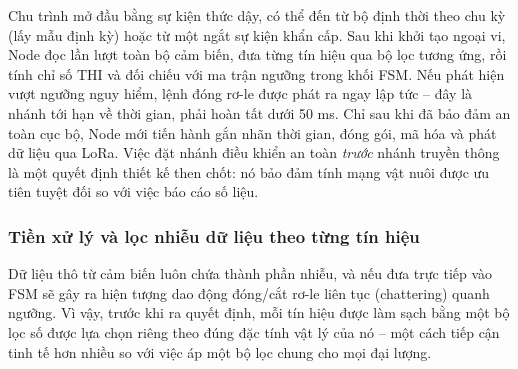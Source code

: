 

Chu trình mở đầu bằng sự kiện thức dậy, có thể đến từ bộ định thời theo chu kỳ (lấy mẫu định kỳ) hoặc từ một ngắt sự kiện khẩn cấp. Sau khi khởi tạo ngoại vi, Node đọc lần lượt toàn bộ cảm biến, đưa từng tín hiệu qua bộ lọc tương ứng, rồi tính chỉ số THI và đối chiếu với ma trận ngưỡng trong khối FSM. Nếu phát hiện vượt ngưỡng nguy hiểm, lệnh đóng rơ-le được phát ra ngay lập tức -- đây là nhánh tới hạn về thời gian, phải hoàn tất dưới 50 ms. Chỉ sau khi đã bảo đảm an toàn cục bộ, Node mới tiến hành gắn nhãn thời gian, đóng gói, mã hóa và phát dữ liệu qua LoRa. Việc đặt nhánh điều khiển an toàn \emph{trước} nhánh truyền thông là một quyết định thiết kế then chốt: nó bảo đảm tính mạng vật nuôi được ưu tiên tuyệt đối so với việc báo cáo số liệu.

\subsubsection{Tiền xử lý và lọc nhiễu dữ liệu theo từng tín hiệu}
Dữ liệu thô từ cảm biến luôn chứa thành phần nhiễu, và nếu đưa trực tiếp vào FSM sẽ gây ra hiện tượng dao động đóng/cắt rơ-le liên tục (chattering) quanh ngưỡng. Vì vậy, trước khi ra quyết định, mỗi tín hiệu được làm sạch bằng một bộ lọc số được lựa chọn riêng theo đúng đặc tính vật lý của nó -- một cách tiếp cận tinh tế hơn nhiều so với việc áp một bộ lọc chung cho mọi đại lượng.

